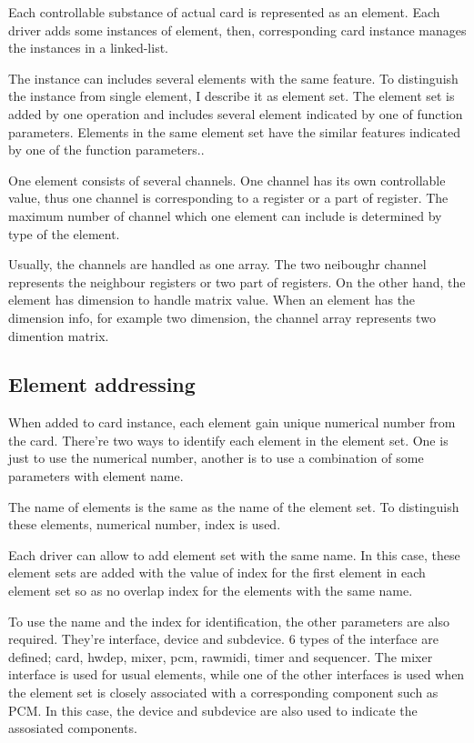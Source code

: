 \documentclass[onecolumn]{article}
\begin{document}
Each controllable substance of actual card is represented as an element. Each driver adds some instances of element, then, corresponding card instance manages the instances in a linked-list.

The instance can includes several elements with the same feature. To distinguish the instance from single element, I describe it as element set. The element set is added by one operation and includes several element indicated by one of function parameters. Elements in the same element set have the similar features indicated by one of the function parameters..

One element consists of several channels. One channel has its own controllable value, thus one channel is corresponding to a register or a part of register. The maximum number of channel which one element can include is determined by type of the element.

Usually, the channels are handled as one array. The two neiboughr channel represents the neighbour registers or two part of registers. On the other hand, the element has dimension to handle matrix value. When an element has the dimension info, for example two dimension, the channel array represents two dimention matrix.


\subsection{Element addressing}

When added to card instance, each element gain unique numerical number from the card. There're two ways to identify each element in the element set. One is just to use the numerical number, another is to use a combination of some parameters with element name.

The name of elements is the same as the name of the element set. To distinguish these elements, numerical number, index is used.

Each driver can allow to add element set with the same name. In this case, these element sets are added with the value of index for the first element in each element set so as no overlap index for the elements with the same name.

To use the name and the index for identification, the other parameters are also required. They're interface, device and subdevice. 6 types of the interface are defined; card, hwdep, mixer, pcm, rawmidi, timer and sequencer. The mixer interface is used for usual elements, while one of the other interfaces is used when the element set is closely associated with a corresponding component such as PCM. In this case, the device and subdevice are also used to indicate the assosiated components\cite{alsa-driver}.
\end{document}
